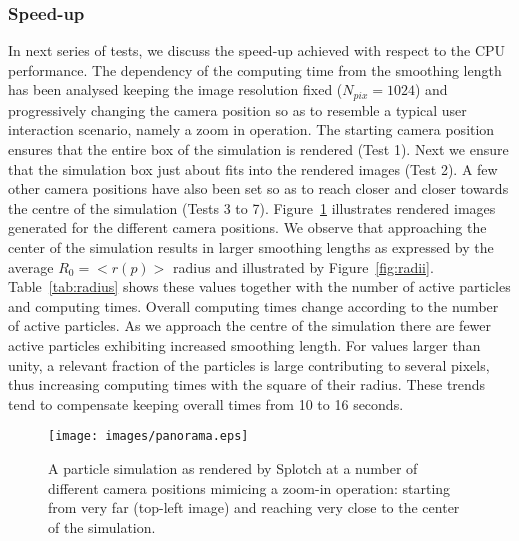 \documentclass[1p]{elsarticle}
\begin{document}
\subsubsection{Speed-up}
\label{sec:speed-up}
In next series of tests, we discuss the speed-up achieved with respect to the CPU performance. The dependency of the computing time from the smoothing length has been analysed keeping the image resolution fixed ($N_{pix} = 1024$) and progressively changing the camera position so as to resemble a typical user interaction scenario, namely a zoom in operation. The starting camera position ensures that the entire box of the simulation is rendered (Test 1). Next we ensure that the simulation box just about fits into the rendered images (Test 2). A few other camera positions have also been set so as to reach closer and closer towards the centre of the simulation (Tests 3 to 7). Figure~\ref{fig:panorama} illustrates rendered images generated for the different camera positions.
We observe that approaching the center of the simulation results in larger smoothing lengths as expressed by the average $R_0=<r(p)>$ radius and illustrated by Figure~\ref{fig:radii}. Table~\ref{tab:radius} shows these values together with the number of active particles and computing times. 
Overall computing times change according to the number of active particles. As we approach the centre of the simulation there are fewer active particles exhibiting increased smoothing length. For values larger than unity, a relevant fraction of the particles is large contributing to several pixels, thus increasing computing times with the square of their radius. These trends tend to compensate keeping overall times from 10 to 16 seconds.
\begin{figure}
\centering
\texttt{[image: images/panorama.eps]}
\caption{A particle simulation as rendered by Splotch at a number of different camera positions mimicing a zoom-in operation: starting from very far (top-left image) and reaching very close to the center of the simulation.}
\label{fig:panorama}
\end{figure}
\end{document}
